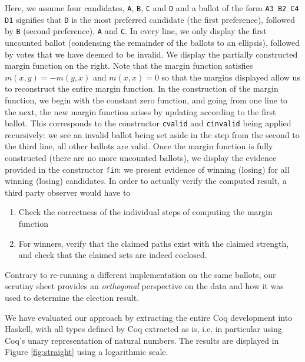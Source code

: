 \noindent
Here, we assume four candidates, \texttt{A}, \texttt{B}, \texttt{C}
and \texttt{D} and a ballot of the form \texttt{A3  B2  C4  D1}
signifies that \texttt{D} is the most preferred candidate (the first
preference), followed by \texttt{B} (second preference), \texttt{A}
and \texttt{C}. In every line, we only display the first uncounted
ballot (condensing the remainder of the ballots to an ellipsis),
followed by votes that we have deemed to be invalid. We display the
partially constructed margin function on the right. Note that the
margin function satisfies  $m(x, y) = -m(y, x)$ and $m(x, x) = 0$ so
that the margins displayed allow us to reconstruct the entire margin
function. In the construction of the margin function, we begin with
the constant zero function, and going from one line to the next, the
new margin function arises by updating according to the first
ballot. This corresponds to the constructor \texttt{cvalid} and
\texttt{cinvalid} being
applied recursively: we see an invalid ballot being set aside in the
step from the second to the third line, all other ballots are valid.
Once the margin function is fully constructed (there are no
more uncounted ballots), we display the evidence provided in the
constructor \texttt{fin}: we present evidence of winning (losing) for
all winning (losing) candidates. 
%
In order to actually verify the computed result, a third party
observer would have to
\begin{enumerate}
\item Check the correctness of the individual steps of computing the
margin function
\item For winners, verify that the claimed paths exist with the
claimed strength, and check that the claimed sets are indeed
coclosed.
\end{enumerate}

\noindent
Contrary to re-running a different implementation on the same
ballots, our scrutiny sheet provides an \emph{orthogonal}
perspective on the data and how it was used to determine the
election result.

We have evaluated our approach by extracting the entire Coq
development into Haskell, with all types defined by Coq extracted as
is, i.e. in particular using Coq's unary representation of natural
numbers. The results are displayed in Figure \ref{fig:straight}
using a logarithmic scale. 




